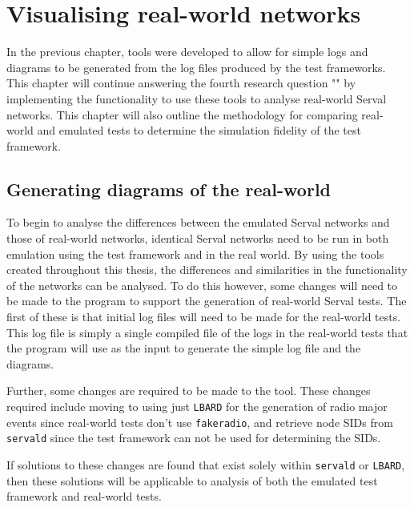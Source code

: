 
\chapter{Visualising real-world networks} %

\label{Chapter6} %


In the previous chapter, tools were developed to allow for simple logs and diagrams to be generated from the log files produced by the test frameworks.
This chapter will continue answering the fourth research question "\fourthRQ" by implementing the functionality to use these tools to analyse real-world Serval networks.
This chapter will also outline the methodology for comparing real-world and emulated tests to determine the simulation fidelity of the test framework.

\section{Generating diagrams of the real-world}   
To begin to analyse the differences between the emulated Serval networks and those of real-world networks, identical Serval networks need to be run in both emulation using the test framework and in the real world.
By using the tools created throughout this thesis, the differences and similarities in the functionality of the networks can be analysed.
To do this however, some changes will need to be made to the program to support the generation of real-world Serval tests.
The first of these is that initial log files will need to be made for the real-world tests.
This log file is simply a single compiled file of the logs in the real-world tests that the program will use as the input to generate the simple log file and the diagrams.

Further, some changes are required to be made to the tool.
These changes required include moving to using just \texttt{LBARD} for the generation of radio major events since real-world tests don't use \texttt{fakeradio}, and retrieve node SIDs from \texttt{servald} since the test framework can not be used for determining the SIDs.

If solutions to these changes are found that exist solely within \texttt{servald} or \texttt{LBARD}, then these solutions will be applicable to analysis of both the emulated test framework and real-world tests.

